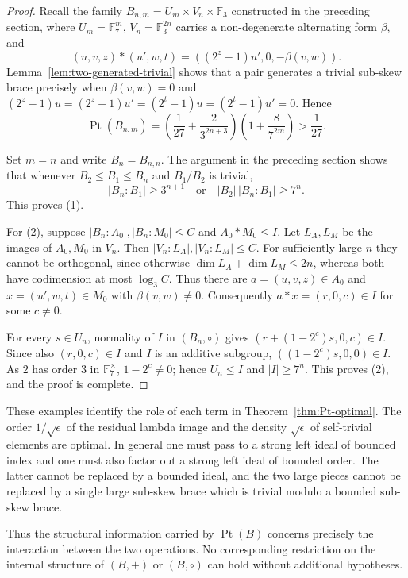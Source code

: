 \documentclass[11pt, oneside]{amsart}
\numberwithin{equation}{section}
\theoremstyle{plain}
\theoremstyle{definition}
\newcommand{\Pt}{\operatorname{Pt} }
\begin{document}
\begin{proof}
Recall the family
$B_{n,m}=U_m\times V_n\times\mathbb F_3$ constructed in the preceding
section, where $U_m=\mathbb F_7^m$, $V_n=\mathbb F_3^{2n}$ carries a
non-degenerate alternating form $\beta$, and
$$
(u,v,z)*(u',w,t)=((2^z-1)u',0,-\beta(v,w)).
$$
Lemma~\ref{lem:two-generated-trivial} shows that a pair generates a
trivial sub-skew brace precisely when $\beta(v,w)=0$ and
$(2^z-1)u=(2^z-1)u'=(2^t-1)u=(2^t-1)u'=0$. Hence
$$
\Pt(B_{n,m})=
\left(\frac1{27}+\frac2{3^{2n+3}}\right)
\left(1+\frac8{7^{2m}}\right)>\frac1{27}.
$$

Set $m=n$ and write $B_n=B_{n,n}$. The argument in the preceding
section shows that whenever $B_2\leqslant B_1\leqslant B_n$ and
$B_1/B_2$ is trivial,
$$
|B_n:B_1|\geqslant3^{n+1}
\quad\text{or}\quad
|B_2|\,|B_n:B_1|\geqslant7^n.
$$
This proves (1).

For (2), suppose $|B_n:A_0|,|B_n:M_0|\leqslant C$ and
$A_0*M_0\leqslant I$. Let $L_A,L_M$ be the images of $A_0,M_0$ in
$V_n$. Then $|V_n:L_A|,|V_n:L_M|\leqslant C$. For sufficiently large
$n$ they cannot be orthogonal, since otherwise
$\dim L_A+\dim L_M\leqslant2n$, whereas both have codimension at most
$\log_3C$. Thus there are
$a=(u,v,z)\in A_0$ and $x=(u',w,t)\in M_0$ with $\beta(v,w)\neq0$.
Consequently $a*x=(r,0,c)\in I$ for some $c\neq0$.

For every $s\in U_n$, normality of $I$ in $(B_n,\circ)$ gives
$(r+(1-2^c)s,0,c)\in I$. Since also $(r,0,c)\in I$ and $I$ is an
additive subgroup, $((1-2^c)s,0,0)\in I$. As $2$ has order $3$ in
$\mathbb F_7^\times$, $1-2^c\neq0$; hence $U_n\leqslant I$ and
$|I|\geqslant7^n$. This proves (2), and the proof is complete.
\end{proof}

These examples identify the role of each term in
Theorem~\ref{thm:Pt-optimal}. The order $1/\sqrt{\epsilon}$ of the
residual lambda image and the density $\sqrt{\epsilon}$ of
self-trivial elements are optimal. In general one must pass to a
strong left ideal of bounded index and one must also factor out a
strong left ideal of bounded order. The latter cannot be replaced by
a bounded ideal, and the two large pieces cannot be replaced by a
single large sub-skew brace which is trivial modulo a bounded
sub-skew brace.

Thus the structural information carried by $\Pt(B)$ concerns precisely
the interaction between the two operations. No corresponding restriction
on the internal structure of $(B,+)$ or $(B,\circ)$ can hold without
additional hypotheses.
\end{document}
